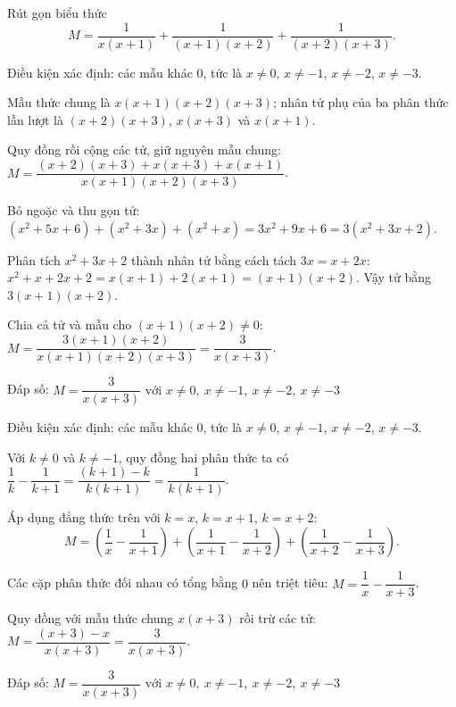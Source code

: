 \begin{problem}[8DS-PS-009]
Rút gọn biểu thức
\[ M = \dfrac{1}{x(x + 1)} + \dfrac{1}{(x + 1)(x + 2)} + \dfrac{1}{(x + 2)(x + 3)}. \]

\begin{solution}
Điều kiện xác định: các mẫu khác $0$, tức là $x \neq 0$, $x \neq -1$, $x \neq -2$, $x \neq -3$.

Mẫu thức chung là $x(x + 1)(x + 2)(x + 3)$; nhân tử phụ của ba phân thức lần lượt là $(x + 2)(x + 3)$, $x(x + 3)$ và $x(x + 1)$.

Quy đồng rồi cộng các tử, giữ nguyên mẫu chung: $M = \dfrac{(x + 2)(x + 3) + x(x + 3) + x(x + 1)}{x(x + 1)(x + 2)(x + 3)}$.

Bỏ ngoặc và thu gọn tử: $(x^2 + 5x + 6) + (x^2 + 3x) + (x^2 + x) = 3x^2 + 9x + 6 = 3(x^2 + 3x + 2)$.

Phân tích $x^2 + 3x + 2$ thành nhân tử bằng cách tách $3x = x + 2x$: $x^2 + x + 2x + 2 = x(x + 1) + 2(x + 1) = (x + 1)(x + 2)$. Vậy tử bằng $3(x + 1)(x + 2)$.

Chia cả tử và mẫu cho $(x + 1)(x + 2) \neq 0$: $M = \dfrac{3(x + 1)(x + 2)}{x(x + 1)(x + 2)(x + 3)} = \dfrac{3}{x(x + 3)}$.

Đáp số: $\boxed{M = \dfrac{3}{x(x + 3)} \text{ với } x \neq 0,\ x \neq -1,\ x \neq -2,\ x \neq -3}$
\end{solution}

\begin{solution}
Điều kiện xác định: các mẫu khác $0$, tức là $x \neq 0$, $x \neq -1$, $x \neq -2$, $x \neq -3$.

Với $k \neq 0$ và $k \neq -1$, quy đồng hai phân thức ta có $\dfrac{1}{k} - \dfrac{1}{k + 1} = \dfrac{(k + 1) - k}{k(k + 1)} = \dfrac{1}{k(k + 1)}$.

Áp dụng đẳng thức trên với $k = x$, $k = x + 1$, $k = x + 2$:
\[ M = \left(\dfrac{1}{x} - \dfrac{1}{x + 1}\right) + \left(\dfrac{1}{x + 1} - \dfrac{1}{x + 2}\right) + \left(\dfrac{1}{x + 2} - \dfrac{1}{x + 3}\right). \]

Các cặp phân thức đối nhau có tổng bằng $0$ nên triệt tiêu: $M = \dfrac{1}{x} - \dfrac{1}{x + 3}$.

Quy đồng với mẫu thức chung $x(x + 3)$ rồi trừ các tử: $M = \dfrac{(x + 3) - x}{x(x + 3)} = \dfrac{3}{x(x + 3)}$.

Đáp số: $\boxed{M = \dfrac{3}{x(x + 3)} \text{ với } x \neq 0,\ x \neq -1,\ x \neq -2,\ x \neq -3}$
\end{solution}
\end{problem}

